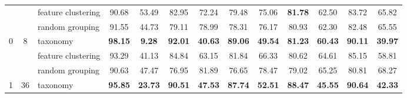 \documentclass[final]{cvpr}
\begin{document}
\begin{table*}[t]
{\begin{tabular}{c|c|l|cc|cc|cc|cc|cc}
                                &                                                                                        & feature clustering                                                                                          & 90.68                & 53.49                 & 82.95                & 72.24                 & 79.48                & 75.06                 & \textbf{81.78}       & 62.50                 & 83.72                & 65.82                \\
                                &                                                                                        & random grouping                                                                                             & 91.55                & 44.73                 & 79.11                & 78.99                 & 78.31                & 76.17                 & 80.93                & 62.30                 & 82.48                & 65.55                \\ \midrule
\multirow{3}{*}{0}              & \multirow{3}{*}{8}                                                                     & taxonomy                                                                                                    & \textbf{98.15}       & \textbf{9.28}         & \textbf{92.01}       & \textbf{40.63}        & \textbf{89.06}       & \textbf{49.54}        & \textbf{81.23}       & \textbf{60.43}        & \textbf{90.11}       & \textbf{39.97}       \\
                                &                                                                                        & feature clustering                                                                                          & 93.29                & 41.13                 & 84.84                & 63.15                 & 81.84                & 66.33                 & 80.62                & 64.61                 & 85.15                & 58.81                \\
                                &                                                                                        & random grouping                                                                                             & 90.63                & 47.47                 & 76.95                & 81.89                 & 76.65                & 78.47                 & 79.02                & 65.25                 & 80.81                & 68.27                \\ \midrule
\multirow{3}{*}{1}              & \multirow{3}{*}{36}                                                                    & taxonomy                                                                                                    & \textbf{95.85}       & \textbf{23.73}        & \textbf{90.51}       & \textbf{47.53}        & \textbf{87.74}       & \textbf{52.51}        & \textbf{88.47}       & \textbf{45.55}        & \textbf{90.64}       & \textbf{42.33}       \\

\end{tabular}}
\end{table*}
\end{document}

